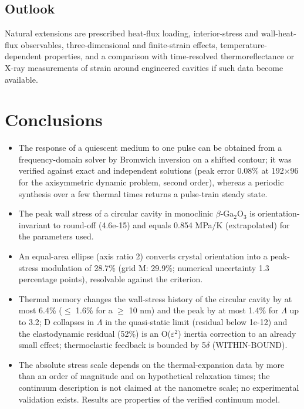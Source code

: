 \documentclass[preprint,12pt]{elsarticle}
\begin{document}
\subsection{Outlook}
\label{sec:7.3}

Natural extensions are prescribed heat-flux loading, interior-stress and wall-heat-flux observables, three-dimensional and finite-strain effects, temperature-dependent properties, and a comparison with time-resolved thermoreflectance or X-ray measurements of strain around engineered cavities if such data become available.

\section{Conclusions}
\label{sec:8}

\begin{itemize}
\item The response of a quiescent medium to one pulse can be obtained from a frequency-domain solver by Bromwich inversion on a shifted contour; it was verified against exact and independent solutions (peak error 0.08\% at 192$\times$96 for the axisymmetric dynamic problem, second order), whereas a periodic synthesis over a few thermal times returns a pulse-train steady state.
\item The peak wall stress of a circular cavity in monoclinic $\beta$-Ga$_2$O$_3$ is orientation-invariant to round-off (4.6e-15) and equals 0.854 MPa/K (extrapolated) for the parameters used.
\item An equal-area ellipse (axis ratio 2) converts crystal orientation into a peak-stress modulation of 28.7\% (grid M: 29.9\%; numerical uncertainty 1.3 percentage points), resolvable against the criterion.
\item Thermal memory changes the wall-stress history of the circular cavity by at most 6.4\% ($\leq$ 1.6\% for a $\geq$ 10 nm) and the peak by at most 1.4\% for $\Lambda$ up to 3.2; D collapses in $\Lambda$ in the quasi-static limit (residual below 1e-12) and the elastodynamic residual (52\%) is an O($\varepsilon^{2}$) inertia correction to an already small effect; thermoelastic feedback is bounded by 5$\delta$ (WITHIN-BOUND).
\item The absolute stress scale depends on the thermal-expansion data by more than an order of magnitude and on hypothetical relaxation times; the continuum description is not claimed at the nanometre scale; no experimental validation exists. Results are properties of the verified continuum model.
\end{itemize}
\end{document}
